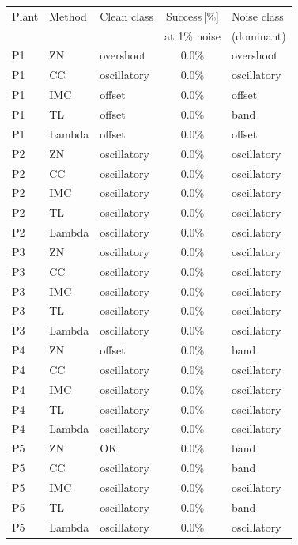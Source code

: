\begin{tabular}{@{}lllcl@{}}
\toprule
Plant & Method & Clean class & Success\,[\%] & Noise class \\
 & & & at 1\% noise & (dominant) \\
\midrule
P1 & ZN & overshoot & 0.0\% & overshoot \\
P1 & CC & oscillatory & 0.0\% & oscillatory \\
P1 & IMC & offset & 0.0\% & offset \\
P1 & TL & offset & 0.0\% & band \\
P1 & Lambda & offset & 0.0\% & offset \\
\midrule
P2 & ZN & oscillatory & 0.0\% & oscillatory \\
P2 & CC & oscillatory & 0.0\% & oscillatory \\
P2 & IMC & oscillatory & 0.0\% & oscillatory \\
P2 & TL & oscillatory & 0.0\% & oscillatory \\
P2 & Lambda & oscillatory & 0.0\% & oscillatory \\
\midrule
P3 & ZN & oscillatory & 0.0\% & oscillatory \\
P3 & CC & oscillatory & 0.0\% & oscillatory \\
P3 & IMC & oscillatory & 0.0\% & oscillatory \\
P3 & TL & oscillatory & 0.0\% & oscillatory \\
P3 & Lambda & oscillatory & 0.0\% & oscillatory \\
\midrule
P4 & ZN & offset & 0.0\% & band \\
P4 & CC & oscillatory & 0.0\% & oscillatory \\
P4 & IMC & oscillatory & 0.0\% & oscillatory \\
P4 & TL & oscillatory & 0.0\% & oscillatory \\
P4 & Lambda & oscillatory & 0.0\% & oscillatory \\
\midrule
P5 & ZN & OK & 0.0\% & band \\
P5 & CC & oscillatory & 0.0\% & band \\
P5 & IMC & oscillatory & 0.0\% & oscillatory \\
P5 & TL & oscillatory & 0.0\% & band \\
P5 & Lambda & oscillatory & 0.0\% & oscillatory \\
\bottomrule
\end{tabular}
